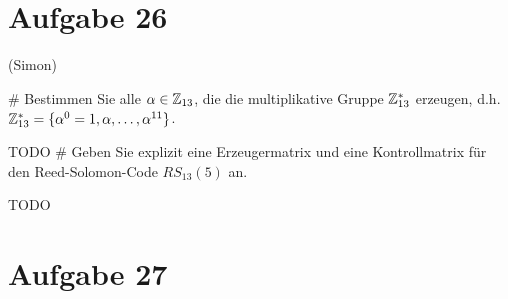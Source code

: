 \section*{Aufgabe 26}
(Simon)
\begin{myList}
#
Bestimmen Sie alle $\alpha \in \mathbb{Z}_{13}$, die die multiplikative Gruppe $\mathbb{Z}_{13}^{\ast}$ erzeugen, d.h. $\mathbb{Z}_{13}^{\ast} = \lbrace \alpha^0 = 1,\alpha,\ldots,\alpha^{11} \rbrace$.
\medskip

TODO
#
Geben Sie explizit eine Erzeugermatrix und eine Kontrollmatrix für den Reed-Solomon-Code $RS_{13}(5)$ an.\medskip

TODO
\end{myList}

\section*{Aufgabe 27}
